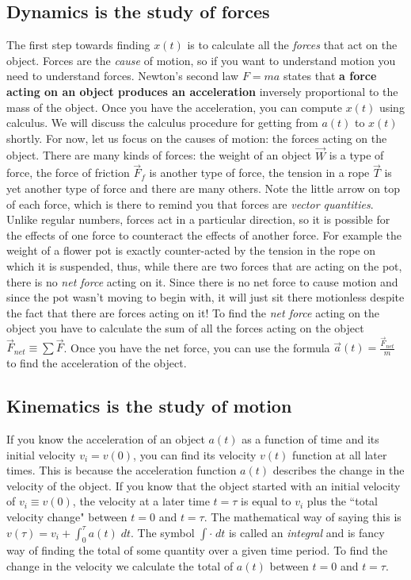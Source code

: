 \documentclass[letterpaper,9pt,journal]{IEEEtran}
\begin{document}
\subsection{Dynamics is the study of forces}
The first step towards finding $x(t)$ is to calculate all the \emph{forces} that act on the object.
Forces are the \emph{cause} of motion, so if you want to understand motion you need to understand forces. 
Newton's second law $F=ma$ states that {\bf a force acting on an object produces an acceleration}
inversely proportional to the mass of the object. 
Once you have the acceleration, you can compute $x(t)$ using calculus.
We will discuss the calculus procedure for getting from $a(t)$ to $x(t)$ shortly.
For now, let us focus on the causes of motion: the forces acting on the object.
There are many kinds of forces: the weight of an object $\vec{W}$ is a type of force, 
the force of friction $\vec{F}_f$ is another type of force, the tension in a rope $\vec{T}$ is 
yet another type of force and there are many others.
Note the little arrow on top of each force, which is there to remind you that forces are \emph{vector quantities}.
Unlike regular numbers, forces act in a particular direction, so it is possible for the effects of 
one force to counteract the effects of another force. For example the weight of a flower pot 
is exactly counter-acted by the tension in the rope on which it is suspended, thus,
while there are two forces that are acting on the pot, there is no \emph{net force} acting on it.
Since there is no net force to cause motion and since the pot wasn't moving to begin with, 
it will just sit there motionless despite the fact that there are forces acting on it!
To find the \emph{net force} acting on the object you have to calculate 
the sum of all the forces acting on the object $\vec{F}_{net} \equiv \sum \vec{F}$.
Once you have the net force, you can use the formula $\vec{a}(t) = \frac{\vec{F}_{net}}{m}$ 
to find the acceleration of the object.

\vspace{-2mm}
\subsection{Kinematics is the study of motion}
If you know the acceleration of an object $a(t)$ as a function of time and its initial velocity $v_i=v(0)$, 
you can find its velocity $v(t)$ function at all later times. 
This is because the acceleration function $a(t)$ describes the change in the velocity of the object.
If you know that the object started with an initial velocity of $v_i \equiv v(0)$,
the velocity at a later time $t=\tau$ is equal to $v_i$ plus the ``total velocity change" between $t=0$ and $t=\tau$.
The mathematical way of saying this is $v(\tau)=v_i+\int_0^\tau a(t)\;dt$.
The symbol $\int \cdot \;dt$ is called an \emph{integral} and is fancy way of finding the total
of some quantity over a given time period. 
To find the change in the velocity we calculate the total of $a(t)$ between $t=0$ and $t=\tau$.
\end{document}
